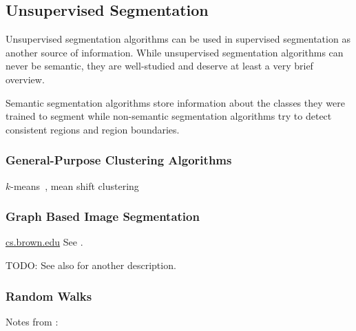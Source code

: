 
\subsection{Unsupervised Segmentation}%
\label{subsec:unsupervised-traditional-segmentation}%

Unsupervised segmentation algorithms can be used in supervised segmentation as
another source of information. While unsupervised segmentation algorithms can
never be semantic, they are well-studied and deserve at least a very brief
overview.

Semantic segmentation algorithms store information about the classes they were
trained to segment while non-semantic segmentation algorithms try to detect
consistent regions and region boundaries.

\subsubsection{General-Purpose Clustering Algorithms}
%


$k$-means~\cite{hartigan1975clustering},
mean shift clustering~\cite{comaniciu2002mean}

\subsubsection{Graph Based Image Segmentation}%
\label{subsec:graph-based-image-segmentation}%
\href{http://cs.brown.edu/~pff/segment/}{cs.brown.edu}
See \cite{felzenszwalb2004efficient}.

TODO: See also \cite{pantofaru2005comparison} for another description.

\subsubsection{Random Walks}
Notes from \cite{meilpa2001learning}:

